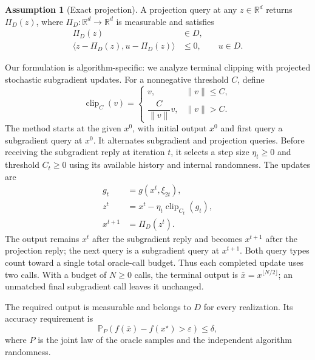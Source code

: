 \documentclass[10pt]{article}
\theoremstyle{definition}
\newtheorem{assumption}{Assumption}
\begin{document}
\begin{assumption}[Exact projection]
A projection query at any $z\in\mathbb{R}^d$ returns $\Pi_D(z)$, where $\Pi_D:\mathbb{R}^d\to\mathbb{R}^d$ is measurable and satisfies
\[
\begin{aligned}
\Pi_D(z)&\in D,\\
\langle z-\Pi_D(z),u-\Pi_D(z)\rangle&\leq0,
\qquad u\in D.
\end{aligned}
\]
\end{assumption}

Our formulation is algorithm-specific: we analyze terminal clipping with projected stochastic subgradient updates. For a nonnegative threshold $C$, define
\[
\operatorname{clip}_{C}(v)=
\begin{cases}
v,&\|v\|\leq C,\\
\dfrac{C}{\|v\|}v,&\|v\|>C.
\end{cases}
\]
The method starts at the given $x^0$, with initial output $x^0$ and first query a subgradient query at $x^0$. It alternates subgradient and projection queries. Before receiving the subgradient reply at iteration $t$, it selects a step size $\eta_t\geq0$ and threshold $C_t\geq0$ using its available history and internal randomness. The updates are
\[
\begin{aligned}
g_t&=g(x^t,\xi_{2t}),\\
z^t&=x^t-\eta_t\operatorname{clip}_{C_t}(g_t),\\
x^{t+1}&=\Pi_D(z^t).
\end{aligned}
\]
The output remains $x^t$ after the subgradient reply and becomes $x^{t+1}$ after the projection reply; the next query is a subgradient query at $x^{t+1}$. Both query types count toward a single total oracle-call budget. Thus each completed update uses two calls. With a budget of $N\geq0$ calls, the terminal output is $\bar{x}=x^{\lfloor N/2\rfloor}$; an unmatched final subgradient call leaves it unchanged.

The required output is measurable and belongs to $D$ for every realization. Its accuracy requirement is
\[
\mathbb{P}_{P}\!\left(f(\bar{x})-f(x^\star)>\varepsilon\right)
\leq\delta,
\]
where $P$ is the joint law of the oracle samples and the independent algorithm randomness.
\end{document}
